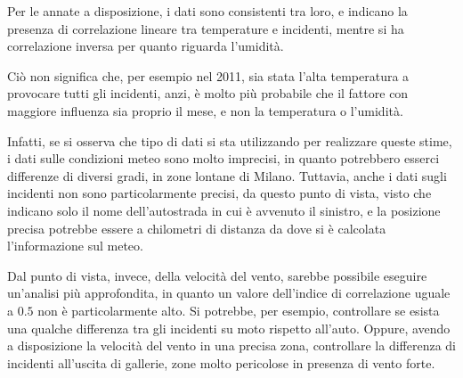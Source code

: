 \documentclass[a4paper]{report}
\begin{document}
Per le annate a disposizione, i dati sono consistenti tra loro, e indicano la presenza di 
correlazione lineare tra temperature e incidenti, mentre si ha correlazione inversa per quanto 
riguarda l'umidità.

Ciò non significa che, per esempio nel 2011, sia stata l'alta temperatura a provocare 
tutti gli incidenti, anzi, è molto più probabile che il fattore con maggiore 
influenza sia proprio il mese, e non la temperatura o l'umidità.

Infatti, se si osserva che tipo di dati si sta utilizzando per realizzare 
queste stime, i dati sulle condizioni meteo sono molto imprecisi, in quanto potrebbero 
esserci differenze di diversi gradi, in zone lontane di Milano.
Tuttavia, anche i dati sugli incidenti non sono particolarmente precisi, da 
questo punto di vista, visto che indicano solo il nome dell'autostrada in cui è avvenuto 
il sinistro, e la posizione precisa potrebbe essere a chilometri di distanza da dove 
si è calcolata l'informazione sul meteo.

Dal punto di vista, invece, della velocità del vento, sarebbe possibile eseguire 
un'analisi più approfondita, in quanto un valore dell'indice di correlazione uguale 
a $0.5$ non è particolarmente alto.
Si potrebbe, per esempio, controllare se esista una qualche differenza tra gli 
incidenti su moto rispetto all'auto. 
Oppure, avendo a disposizione la velocità del vento in una precisa zona, controllare 
la differenza di incidenti all'uscita di gallerie, zone molto pericolose 
in presenza di vento forte.


\printbibliography
\end{document}
